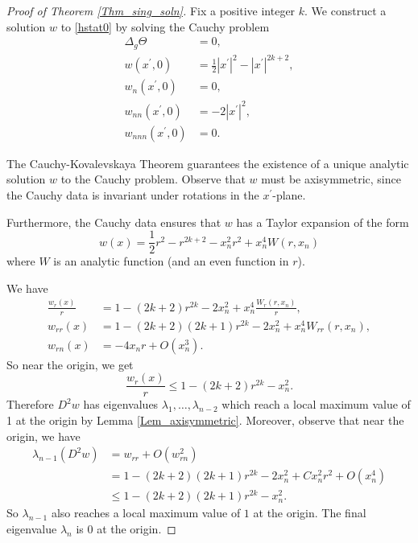 \documentclass[12pt,reqno]{amsart}%
\theoremstyle{plain}
\numberwithin{equation}{section}
\theoremstyle{definition}
\theoremstyle{remark}
\begin{document}
\begin{proof}[Proof of Theorem \ref{Thm_sing_soln}]
Fix a positive integer $k$.  We construct a solution $w$ to \eqref{hstat0} by solving the Cauchy problem 
\begin{equation*}
\begin{aligned} 
\Delta_g \Theta &=0,\\
w ( x^\prime , 0) & = \frac 12 | x^\prime |^2 - |x^\prime |^{2k+2} , \\
w_n ( x^\prime , 0) & = 0 ,\\
w_{nn}( x^\prime , 0)  & = -2 |x^\prime |^{2} ,\\
w_{nnn} ( x^\prime , 0) & = 0. 
\end{aligned}
\end{equation*} 
  

The Cauchy-Kovalevskaya Theorem guarantees the existence of a unique analytic solution $w$ to the Cauchy problem. Observe that $w$ must be axisymmetric, since the Cauchy data is invariant under rotations in the $x^\prime$-plane. 

Furthermore, the Cauchy data ensures that $w$ has a Taylor expansion of the form 
$$
w(x) = \frac 12 r^2 - r^{2k+2} - x_n^2 r^2  + x_n^4W( r,x_n)
$$ where $W$ is an analytic function (and an even function in $r$). 

We have 
\begin{align}
\frac{w_r(x)}{r} & = 1 - (2k+2) r^{2k} - 2 x_n^2 + x_n^4 \frac{ W_r (r,x_n)}{r}, \label{wr/r} \\
w_{rr} (x) & = 1 - (2k+2)(2k+1) r^{2k} -2x_n^2+ x_n^4 W_{rr} (r,x_n ),\nonumber\\
w_{rn} (x) &= -4x_n r + O ( x_n^3)\nonumber. 
\end{align}
So near the origin, we get
\begin{equation*} \frac{w_r(x)}{r} \leq 1 - ( 2k+2)r^{2k} - x_n^2 .\label{lambda1_hd}\end{equation*}
Therefore $D^2w $ has eigenvalues $\lambda_1 , \dots, \lambda_{n-2}$ which reach a local 
maximum value of 1 at the origin by Lemma \ref{Lem_axisymmetric}. 
Moreover, observe that near the origin, we have
\begin{equation} \begin{aligned} \lambda_{n-1}( D^2 w ) &= w_{rr} + O ( w_{rn}^2 ) \\&= 1 - (2k+2) ( 2k+1 ) r^{2k}- 2 x_n^2  + C x_n^2 r^2 + O ( x_n^4 ) \\ & \leq 1  - (2k+2) ( 2k+1 ) r^{2k}-  x_n^2 .\label{lambda_n-1_hd} \end{aligned} \end{equation} 
So $\lambda_{n-1}$ also reaches a local maximum value of $1$ at the origin. The final eigenvalue $\lambda_n$ is $0$ at the origin.


\end{proof}
\end{document}
